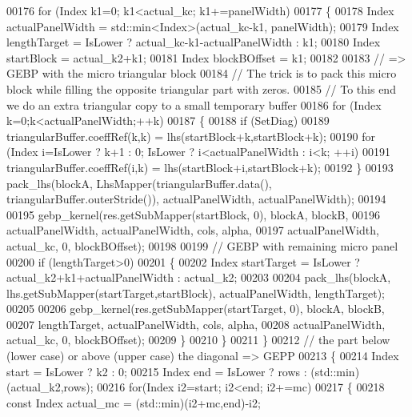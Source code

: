 \begin{DoxyCode}
00176         \textcolor{keywordflow}{for} (Index k1=0; k1<actual\_kc; k1+=panelWidth)
00177         \{
00178           Index actualPanelWidth = std::min<Index>(actual\_kc-k1, panelWidth);
00179           Index lengthTarget = IsLower ? actual\_kc-k1-actualPanelWidth : k1;
00180           Index startBlock   = actual\_k2+k1;
00181           Index blockBOffset = k1;
00182 
00183           \textcolor{comment}{// => GEBP with the micro triangular block}
00184           \textcolor{comment}{// The trick is to pack this micro block while filling the opposite triangular part with zeros.}
00185           \textcolor{comment}{// To this end we do an extra triangular copy to a small temporary buffer}
00186           \textcolor{keywordflow}{for} (Index k=0;k<actualPanelWidth;++k)
00187           \{
00188             \textcolor{keywordflow}{if} (SetDiag)
00189               triangularBuffer.coeffRef(k,k) = lhs(startBlock+k,startBlock+k);
00190             \textcolor{keywordflow}{for} (Index i=IsLower ? k+1 : 0; IsLower ? i<actualPanelWidth : i<k; ++i)
00191               triangularBuffer.coeffRef(i,k) = lhs(startBlock+i,startBlock+k);
00192           \}
00193           pack\_lhs(blockA, LhsMapper(triangularBuffer.data(), triangularBuffer.outerStride()), 
      actualPanelWidth, actualPanelWidth);
00194 
00195           gebp\_kernel(res.getSubMapper(startBlock, 0), blockA, blockB,
00196                       actualPanelWidth, actualPanelWidth, cols, alpha,
00197                       actualPanelWidth, actual\_kc, 0, blockBOffset);
00198 
00199           \textcolor{comment}{// GEBP with remaining micro panel}
00200           \textcolor{keywordflow}{if} (lengthTarget>0)
00201           \{
00202             Index startTarget  = IsLower ? actual\_k2+k1+actualPanelWidth : actual\_k2;
00203 
00204             pack\_lhs(blockA, lhs.getSubMapper(startTarget,startBlock), actualPanelWidth, lengthTarget);
00205 
00206             gebp\_kernel(res.getSubMapper(startTarget, 0), blockA, blockB,
00207                         lengthTarget, actualPanelWidth, cols, alpha,
00208                         actualPanelWidth, actual\_kc, 0, blockBOffset);
00209           \}
00210         \}
00211       \}
00212       \textcolor{comment}{// the part below (lower case) or above (upper case) the diagonal => GEPP}
00213       \{
00214         Index start = IsLower ? k2 : 0;
00215         Index end   = IsLower ? rows : (std::min)(actual\_k2,rows);
00216         \textcolor{keywordflow}{for}(Index i2=start; i2<end; i2+=mc)
00217         \{
00218           \textcolor{keyword}{const} Index actual\_mc = (std::min)(i2+mc,end)-i2;

\end{DoxyCode}
